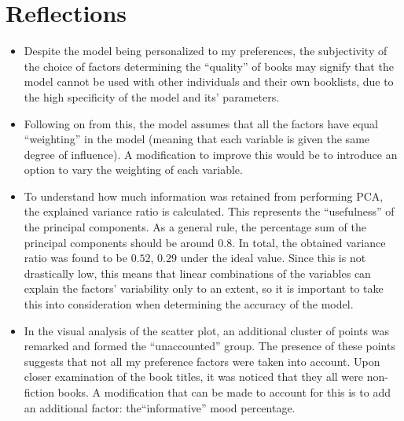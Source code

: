 \documentclass[12pt]{article}
\begin{document}
\pagebreak

\section{Reflections}
\begin{itemize}
    \item Despite the model being personalized to my preferences, the subjectivity of the choice of factors determining the “quality” of books may signify that the model cannot be used with other individuals and their own booklists, due to the high specificity of the model and its’ parameters.
    \item Following on from this, the model assumes that all the factors have equal “weighting” in the model (meaning that each variable is given the same degree of influence). A modification to improve this would be to introduce an option to vary the weighting of each variable.
    \item \parencite{3} To understand how much information was retained from performing PCA, the explained variance ratio is calculated. This represents the “usefulness” of the principal components. As a general rule, the percentage sum of the principal components should be around $0.8$. In total, the obtained variance ratio was found to be $0.52$, $0.29$ under the ideal value. Since this is not drastically low, this means that linear combinations of the variables can explain the factors’ variability only to an extent, so it is important to take this into consideration when determining the accuracy of the model.
    \item In the visual analysis of the scatter plot, an additional cluster of points was remarked and formed the “unaccounted” group. The presence of these points suggests that not all my preference factors were taken into account. Upon closer examination of the book titles, it was noticed that they all were non-fiction books. A modification that can be made to account for this is to add an additional factor: the“informative” mood percentage.
\end{itemize}
\end{document}
